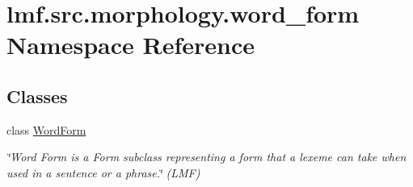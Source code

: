 \hypertarget{namespacelmf_1_1src_1_1morphology_1_1word__form}{\section{lmf.\+src.\+morphology.\+word\+\_\+form Namespace Reference}
\label{namespacelmf_1_1src_1_1morphology_1_1word__form}
}
\subsection*{Classes}
\begin{DoxyCompactItemize}
\item 
class \hyperlink{classlmf_1_1src_1_1morphology_1_1word__form_1_1_word_form}{Word\+Form}
\begin{DoxyCompactList}\small\item\em \char`\"{}\+Word Form is a Form subclass representing a form that a lexeme can take when used in a sentence or a phrase.\char`\"{} (L\+M\+F) \end{DoxyCompactList}\end{DoxyCompactItemize}
